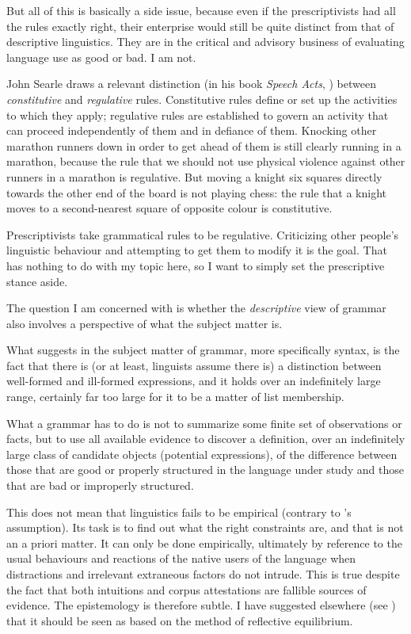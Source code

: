 \documentclass[output=paper]{langscibook}
\begin{document}
But all of this is basically a side issue, because even if the prescriptivists had all the rules exactly right, their enterprise would still be quite distinct from that of descriptive linguistics. They are in the critical and advisory business of evaluating language use as good or bad. I am not.

John Searle draws a relevant distinction (in his book \textit{Speech Acts}, \citeyear{Searle69}) between \emph{constitutive} and \emph{regulative} rules.  Constitutive rules define or set up the activities to which they apply; regulative rules are established to govern an activity that can proceed independently of them and in defiance of them.  Knocking other marathon runners down in order to get ahead of them is still clearly running in a marathon, because the rule that we should not use physical violence against other runners in a marathon is regulative. But moving a knight six squares directly towards the other end of the board is not playing chess: the rule that a knight moves to a second-nearest square of opposite colour is constitutive.

Prescriptivists take grammatical rules to be regulative. Criticizing other people's linguistic behaviour and attempting to get them to modify it is the goal.  That has nothing to do with my topic here, so I want to simply set the prescriptive stance aside.

The question I am concerned with is whether the \emph{descriptive} view of grammar also involves a  perspective of what the subject matter is.

What suggests  in the subject matter of grammar, more specifically syntax, is the fact that there is (or at least, linguists assume there is) a distinction between well-formed and ill-formed expressions, and it holds over an indefinitely large range, certainly far too large for it to be a matter of list membership.

What a grammar has to do is not to summarize some finite set of observations or facts, but to use all available evidence to discover a definition, over an indefinitely large class of candidate objects (potential expressions), of the difference between those that are good or properly structured in the language under study and those that are bad or improperly structured.

This does not mean that linguistics fails to be empirical (contrary to {\Sampson}'s assumption). Its task is to find out what the right constraints are, and that is not an a priori matter. It can only be done empirically, ultimately by reference to the usual behaviours and reactions of the native users of the language when distractions and irrelevant extraneous factors do not intrude. This is true despite the fact that both intuitions and corpus attestations are fallible sources of evidence. The epistemology is therefore subtle. I have suggested elsewhere (see \citealt{Pullum17}) that it should be seen as based on the method of reflective equilibrium.
\end{document}
